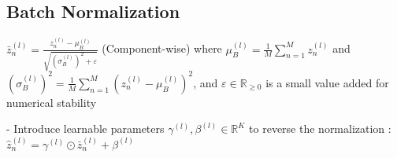 








\subsection*{Batch Normalization}

$
\bar{z}_{n}^{(l)}=\frac{z_{n}^{(l)}-\mu_{B}^{(l)}}{\sqrt{\left(\sigma_{B}^{(l)}\right)^{2}+\varepsilon}}
$ (Component-wise)
where $\mu_{B}^{(l)}=\frac{1}{M} \sum_{n=1}^{M} z_{n}^{(l)}$ and $\left(\sigma_{B}^{(l)}\right)^{2}=\frac{1}{M} \sum_{n=1}^{M}\left(z_{n}^{(l)}-\mu_{B}^{(l)}\right)^{2}$, and $\varepsilon \in \mathbb{R}_{\geq 0}$ is a small value added for numerical stability

- Introduce learnable parameters $\gamma^{(l)}, \beta^{(l)} \in \mathbb{R}^{K}$ to reverse the normalization :
$
\hat{z}_{n}^{(l)}=\gamma^{(l)} \odot \bar{z}_{n}^{(l)}+\beta^{(l)}
$

